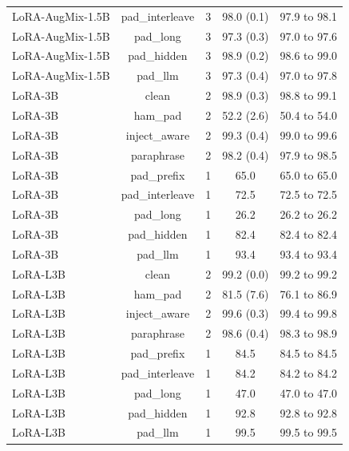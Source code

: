 \begin{table}[t]
\begin{tabular}{lcccc}
LoRA-AugMix-1.5B & pad\_interleave & 3 & 98.0 (0.1) & 97.9 to 98.1 \\
LoRA-AugMix-1.5B & pad\_long & 3 & 97.3 (0.3) & 97.0 to 97.6 \\
LoRA-AugMix-1.5B & pad\_hidden & 3 & 98.9 (0.2) & 98.6 to 99.0 \\
LoRA-AugMix-1.5B & pad\_llm & 3 & 97.3 (0.4) & 97.0 to 97.8 \\
LoRA-3B & clean & 2 & 98.9 (0.3) & 98.8 to 99.1 \\
LoRA-3B & ham\_pad & 2 & 52.2 (2.6) & 50.4 to 54.0 \\
LoRA-3B & inject\_aware & 2 & 99.3 (0.4) & 99.0 to 99.6 \\
LoRA-3B & paraphrase & 2 & 98.2 (0.4) & 97.9 to 98.5 \\
LoRA-3B & pad\_prefix & 1 & 65.0 & 65.0 to 65.0 \\
LoRA-3B & pad\_interleave & 1 & 72.5 & 72.5 to 72.5 \\
LoRA-3B & pad\_long & 1 & 26.2 & 26.2 to 26.2 \\
LoRA-3B & pad\_hidden & 1 & 82.4 & 82.4 to 82.4 \\
LoRA-3B & pad\_llm & 1 & 93.4 & 93.4 to 93.4 \\
LoRA-L3B & clean & 2 & 99.2 (0.0) & 99.2 to 99.2 \\
LoRA-L3B & ham\_pad & 2 & 81.5 (7.6) & 76.1 to 86.9 \\
LoRA-L3B & inject\_aware & 2 & 99.6 (0.3) & 99.4 to 99.8 \\
LoRA-L3B & paraphrase & 2 & 98.6 (0.4) & 98.3 to 98.9 \\
LoRA-L3B & pad\_prefix & 1 & 84.5 & 84.5 to 84.5 \\
LoRA-L3B & pad\_interleave & 1 & 84.2 & 84.2 to 84.2 \\
LoRA-L3B & pad\_long & 1 & 47.0 & 47.0 to 47.0 \\
LoRA-L3B & pad\_hidden & 1 & 92.8 & 92.8 to 92.8 \\
LoRA-L3B & pad\_llm & 1 & 99.5 & 99.5 to 99.5 \\
\bottomrule
\end{tabular}
\end{table}
